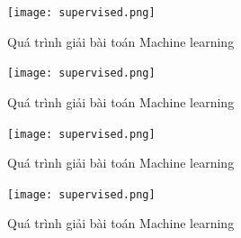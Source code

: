 \documentclass[12pt,a4paper,oneside,openright]{article}
\numberwithin{subsection}{section}
\theoremstyle{definition}
\theoremstyle{plain}
\theoremstyle{definition}
\theoremstyle{definition}
\theoremstyle{remark}
\theoremstyle{definition}
\begin{document}
\begin{figure}[h!]
  \caption{Quá trình giải bài toán Machine learning}
  \texttt{[image: supervised.png]}
  \label{fg:supervised}
\end{figure}


\begin{figure}[h!]
  \caption{Quá trình giải bài toán Machine learning}
  \texttt{[image: supervised.png]}
  \label{fg:supervised}
\end{figure}


\begin{figure}[h!]
  \caption{Quá trình giải bài toán Machine learning}
  \texttt{[image: supervised.png]}
  \label{fg:supervised}
\end{figure}


\begin{figure}[h!]
  \caption{Quá trình giải bài toán Machine learning}
  \texttt{[image: supervised.png]}
  \label{fg:supervised}
\end{figure}
\end{document}
